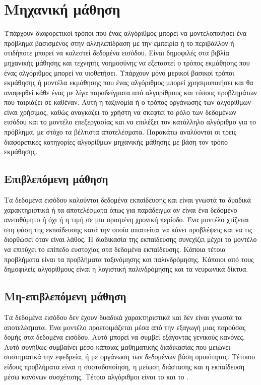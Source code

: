 \section{Μηχανική μάθηση}
Υπάρχουν διαφορετικοί τρόποι που ένας αλγόριθμος μπορεί να μοντελοποιήσει ένα πρόβλημα βασισμένος στην αλληλεπίδραση με την εμπειρία ή το περιβάλλον ή οτιδήποτε μπορεί να καλεστεί δεδομένα εισόδου. Είναι δημοφιλές στα βιβλία μηχανικής μάθησης και τεχνητής νοημοσύνης να εξεταστεί ο τρόπος εκμάθησης που ένας αλγόριθμος μπορεί να υιοθετήσει. Υπάρχουν μόνο μερικοί βασικοί τρόποι εκμάθησης ή μοντέλα εκμάθησης που ένας αλγόριθμος μπορεί χρησιμοποιήσει και θα αναφερθεί κάθε ένας με λίγα παραδείγματα από αλγορίθμους και τύπους προβλημάτων που ταιριάζει σε καθέναν. Αυτή η ταξινομία ή ο τρόπος οργάνωσης των αλγορίθμων είναι χρήσιμος, καθώς αναγκάζει το χρήστη να σκεφτεί το ρόλο των δεδομένων εισόδου και το μοντέλο επεξεργασίας και να επιλέξει τον κατάλληλο αλγόριθμο για το πρόβλημα, με στόχο τα βέλτιστα αποτελέσματα. Παρακάτω αναλύονται οι τρεις διαφορετικές κατηγορίες αλγορίθμων μηχανικής μάθησης με βάση τον τρόπο εκμάθησης.
\subsection{Επιβλεπόμενη μάθηση}
Τα δεδομένα εισόδου καλούνται δεδομένα εκπαίδευσης και είναι γνωστά τα δυαδικά χαρακτηριστικά ή τα αποτελέσματα όπως για παράδειγμα αν είναι ένα δεδομένο ανεπιθύμητο ή όχι ή η τιμή σε μια ορισμένη χρονική περίοδο. Ένα μοντέλο χτίζεται στη φάση της εκπαίδευσης κατά την οποία απαιτείται να κάνει προβλέψεις και να τις διορθώσει όταν είναι λάθος. Η διαδικασία της εκπαίδευσης συνεχίζει μέχρι το μοντέλο να επιτύχει το επίπεδο ευστοχίας στα δεδομένα εκπαίδευσης. Κάποια τέτοια προβλήματα είναι τα προβλήματα ταξινόμησης και παλινδρόμησης. Κάποιοι από τους δημοφιλείς αλγορίθμους είναι η λογιστική παλινδρόμησης και τα νευρωνικά δίκτυα.
\subsection{Μη-επιβλεπόμενη μάθηση}
Τα δεδομένα εισόδου δεν έχουν δυαδικά χαρακτηριστικά και δεν είναι γνωστά τα αποτελέσματα. Ένα μοντέλο προετοιμάζεται μέσα από την εξαγωγή μιας παρούσας δομής στα δεδομένα εισόδου. Αυτό μπορεί να συμβεί εξάγοντας γενικούς κανόνες. Αυτό συνήθως συμβαίνει μέσο κάποιας μαθηματικής διαδικασίας που μειώνει συστηματικά την εφεδρεία, ή με οργάνωση των δεδομένων βάση ομοιότητας. Τέτοιου είδους προβλήματα είναι η συσταδοποίηση, η μείωση διάστασης και η εκπαίδευση μέσω κανόνων συσχέτισης. Τέτοιο αλγόριθμοι είναι το  και το .
